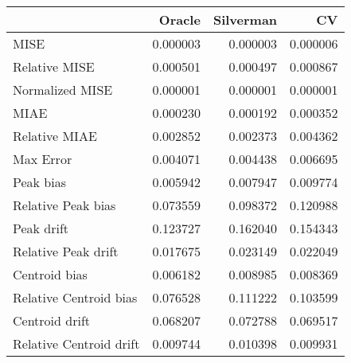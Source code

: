 \begin{tabular}{lrrr}
  \hline
 & Oracle & Silverman & CV \\ 
  \hline
MISE & 0.000003 & 0.000003 & 0.000006 \\ 
  Relative MISE & 0.000501 & 0.000497 & 0.000867 \\ 
  Normalized MISE & 0.000001 & 0.000001 & 0.000001 \\ 
  MIAE & 0.000230 & 0.000192 & 0.000352 \\ 
  Relative MIAE & 0.002852 & 0.002373 & 0.004362 \\ 
  Max Error & 0.004071 & 0.004438 & 0.006695 \\ 
  Peak bias & 0.005942 & 0.007947 & 0.009774 \\ 
  Relative Peak bias & 0.073559 & 0.098372 & 0.120988 \\ 
  Peak drift & 0.123727 & 0.162040 & 0.154343 \\ 
  Relative Peak drift & 0.017675 & 0.023149 & 0.022049 \\ 
  Centroid bias & 0.006182 & 0.008985 & 0.008369 \\ 
  Relative Centroid bias & 0.076528 & 0.111222 & 0.103599 \\ 
  Centroid drift & 0.068207 & 0.072788 & 0.069517 \\ 
  Relative Centroid drift & 0.009744 & 0.010398 & 0.009931 \\ 
   \hline
\end{tabular}

